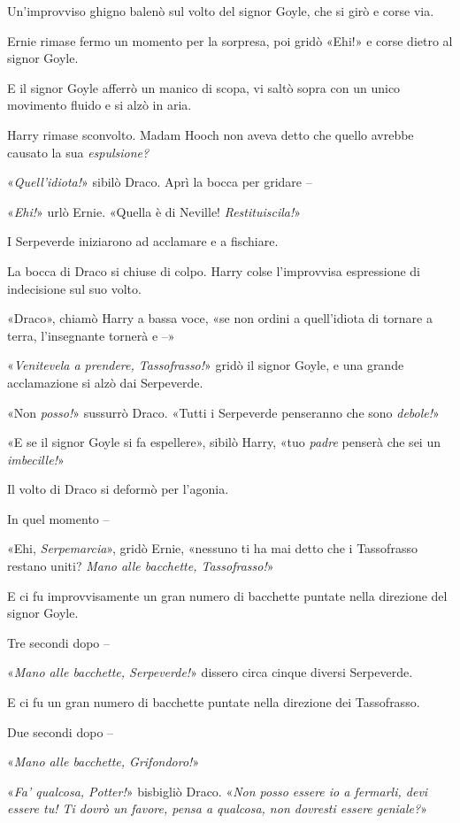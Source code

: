Un’improvviso ghigno balenò sul volto del signor Goyle, che si girò e corse via.

Ernie rimase fermo un momento per la sorpresa, poi gridò «Ehi!» e corse dietro al signor Goyle.

E il signor Goyle afferrò un manico di scopa, vi saltò sopra con un unico movimento fluido e si alzò in aria.

Harry rimase sconvolto. Madam Hooch non aveva detto che quello avrebbe causato la sua \textit{espulsione?}

«\textit{Quell’idiota!}» sibilò Draco. Aprì la bocca per gridare –

«\textit{Ehi!}» urlò Ernie. «Quella è di Neville! \textit{Restituiscila!}»

I Serpeverde iniziarono ad acclamare e a fischiare.

La bocca di Draco si chiuse di colpo. Harry colse l’improvvisa espressione di indecisione sul suo volto.

«Draco», chiamò Harry a bassa voce, «se non ordini a quell’idiota di tornare a terra, l’insegnante tornerà e –»

«\textit{Venitevela a prendere, Tassofrasso!}» gridò il signor Goyle, e una grande acclamazione si alzò dai Serpeverde.

«Non \textit{posso!}» sussurrò Draco. «Tutti i Serpeverde penseranno che sono \textit{debole!}»

«E se il signor Goyle si fa espellere», sibilò Harry, «tuo \textit{padre} penserà che sei un \textit{imbecille!}»

Il volto di Draco si deformò per l’agonia.

In quel momento –

«Ehi, \textit{Serpemarcia}», gridò Ernie, «nessuno ti ha mai detto che i Tassofrasso restano uniti? \textit{Mano alle bacchette, Tassofrasso!}»

E ci fu improvvisamente un gran numero di bacchette puntate nella direzione del signor Goyle.

Tre secondi dopo –

«\textit{Mano alle bacchette, Serpeverde!}» dissero circa cinque diversi Serpeverde.

E ci fu un gran numero di bacchette puntate nella direzione dei Tassofrasso.

Due secondi dopo –

«\textit{Mano alle bacchette, Grifondoro!}»

«\textit{Fa’ qualcosa, Potter!}» bisbigliò Draco. «\textit{Non posso essere io a fermarli, devi essere tu! Ti dovrò un favore, pensa a qualcosa, non dovresti essere geniale?}»

